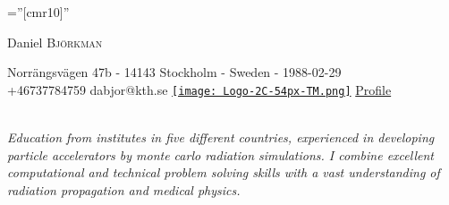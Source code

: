 \documentclass[a4paper,10pt]{article}
\begin{document}
\pagestyle{empty} %
 
\font\fb=''[cmr10]'' %
\par{\centering
        {\Huge Daniel \textsc{Björkman}
        
    }Norrängsvägen 47b - 14143 Stockholm - Sweden - 1988-02-29\\
    \phone \enspace +46737784759 \enspace \textbullet \enspace \Envelope \enspace dabjor@kth.se \textbullet \enspace  \href{http://www.linkedin.com/in/danielbjorkman88}{\texttt{[image: Logo-2C-54px-TM.png]}} \href{http://www.linkedin.com/in/danielbjorkman88}{Profile} \\ \\
   
    \centering
 
    \bigskip\par
    }
  
 
\emph{Education from institutes in five different countries, experienced in developing particle accelerators by monte carlo radiation simulations. I combine excellent computational and technical problem solving skills with a vast understanding of radiation propagation and medical physics.}
 

 
\end{document}
